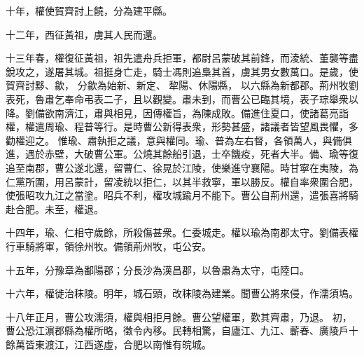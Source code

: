 \begin{pinyinscope}
 
 
 
 十年，權使賀齊討上饒，分為建平縣。
 
 
 
 
 十二年，西征黃祖，虜其人民而還。
 
 
十三年春，權復征黃祖，祖先遣舟兵拒軍，都尉呂蒙破其前鋒，而淩統、董襲等盡銳攻之，遂屠其城。祖挺身亡走，騎士馮則追梟其首，虜其男女數萬口。是歲，使賀齊討黟、歙，
 分歙為始新、新定、
 犂陽、休陽縣，
 以六縣為新都郡。荊州牧劉表死，魯肅乞奉命弔表二子，且以觀變。肅未到，而曹公已臨其境，表子琮舉衆以降。劉備欲南濟江，肅與相見，因傳權旨，為陳成敗。備進住夏口，使諸葛亮詣權，權遣周瑜、程普等行。是時曹公新得表衆，形勢甚盛，諸議者皆望風畏懼，多勸權迎之。
 惟瑜、肅執拒之議，意與權同。瑜、普為左右督，各領萬人，與備俱進，遇於赤壁，大破曹公軍。公燒其餘船引退，士卒饑疫，死者大半。備、瑜等復追至南郡，曹公遂北還，留曹仁、徐晃於江陵，使樂進守襄陽。時甘寧在夷陵，為仁黨所圍，用呂蒙計，留凌統以拒仁，以其半救寧，軍以勝反。權自率衆圍合肥，使張昭攻九江之當塗。昭兵不利，權攻城踰月不能下。曹公自荊州還，遣張喜將騎赴合肥。未至，權退。
 
 
 
 
 十四年，瑜、仁相守歲餘，所殺傷甚衆。仁委城走。權以瑜為南郡太守。劉備表權行車騎將軍，領徐州牧。備領荊州牧，屯公安。
 
 
 
 
 十五年，分豫章為鄱陽郡；分長沙為漢昌郡，以魯肅為太守，屯陸口。
 
 
 
 
 十六年，權徙治秣陵。明年，城石頭，改秣陵為建業。聞曹公將來侵，作濡須塢。
 
 
十八年正月，曹公攻濡須，權與相拒月餘。曹公望權軍，歎其齊肅，乃退。
 初，曹公恐江濵郡縣為權所略，徵令內移。民轉相驚，自廬江、九江、蘄春、廣陵戶十餘萬皆東渡江，江西遂虛，合肥以南惟有皖城。
 

\end{pinyinscope}
